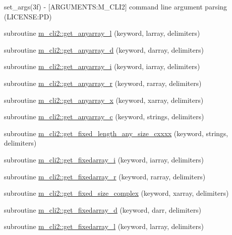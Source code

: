 \begin{DoxyCompactItemize}
\begin{DoxyCompactList}
set\+\_\+args(3f) -\/ \mbox{[}A\+R\+G\+U\+M\+E\+N\+TS\+:M\+\_\+\+C\+L\+I2\mbox{]} command line argument parsing (L\+I\+C\+E\+N\+SE\+:PD) \end{DoxyCompactList}\item 
subroutine \mbox{\hyperlink{namespacem__cli2_a47cc758d20b655bc21672c31289e54ce}{m\+\_\+cli2\+::get\+\_\+anyarray\+\_\+l}} (keyword, larray, delimiters)
\item 
subroutine \mbox{\hyperlink{namespacem__cli2_aaede1f28172778cf45f4b6c04967bbbd}{m\+\_\+cli2\+::get\+\_\+anyarray\+\_\+d}} (keyword, darray, delimiters)
\item 
subroutine \mbox{\hyperlink{namespacem__cli2_ad314315dd5c93abff5168265f5ff0e4e}{m\+\_\+cli2\+::get\+\_\+anyarray\+\_\+i}} (keyword, iarray, delimiters)
\item 
subroutine \mbox{\hyperlink{namespacem__cli2_a8f1d5223b075f23d513c94548a1ebf09}{m\+\_\+cli2\+::get\+\_\+anyarray\+\_\+r}} (keyword, rarray, delimiters)
\item 
subroutine \mbox{\hyperlink{namespacem__cli2_ab9ab288fa5f108beeb7c94d81b223b7c}{m\+\_\+cli2\+::get\+\_\+anyarray\+\_\+x}} (keyword, xarray, delimiters)
\item 
subroutine \mbox{\hyperlink{namespacem__cli2_a448e8e24406f4bdbc14f26a940cbbc2c}{m\+\_\+cli2\+::get\+\_\+anyarray\+\_\+c}} (keyword, strings, delimiters)
\item 
subroutine \mbox{\hyperlink{namespacem__cli2_abc31389c45dcd95b8db641b59b98b447}{m\+\_\+cli2\+::get\+\_\+fixed\+\_\+length\+\_\+any\+\_\+size\+\_\+cxxxx}} (keyword, strings, delimiters)
\item 
subroutine \mbox{\hyperlink{namespacem__cli2_aa469ba94e6bb122c9bf30dd8642b693b}{m\+\_\+cli2\+::get\+\_\+fixedarray\+\_\+i}} (keyword, iarray, delimiters)
\item 
subroutine \mbox{\hyperlink{namespacem__cli2_afbec790abad0dca990c0a61cd2d9e9ae}{m\+\_\+cli2\+::get\+\_\+fixedarray\+\_\+r}} (keyword, rarray, delimiters)
\item 
subroutine \mbox{\hyperlink{namespacem__cli2_a32b78784e20e29bf40f17e16d08336fa}{m\+\_\+cli2\+::get\+\_\+fixed\+\_\+size\+\_\+complex}} (keyword, xarray, delimiters)
\item 
subroutine \mbox{\hyperlink{namespacem__cli2_a2c8db0f383888cb2b3ce8643de3fae93}{m\+\_\+cli2\+::get\+\_\+fixedarray\+\_\+d}} (keyword, darr, delimiters)
\item 
subroutine \mbox{\hyperlink{namespacem__cli2_a65ffe8c7a444db5db3be3f6edecef008}{m\+\_\+cli2\+::get\+\_\+fixedarray\+\_\+l}} (keyword, larray, delimiters)

\end{DoxyCompactItemize}
